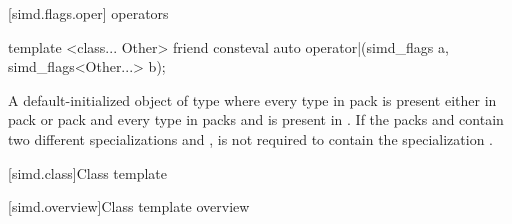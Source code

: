 [simd.flags.oper]{ operators}

\begin{itemdecl}
template <class... Other>
  friend consteval auto operator|(simd_flags a, simd_flags<Other...> b);
\end{itemdecl}

\begin{itemdescr}
  \pnum\returns
  A default-initialized object of type  where
  every type in pack  is present either in pack  or
  pack  and every type in packs  and  is
  present in .
  If the packs  and  contain two
  different specializations  and
  ,  is not required to contain the
  specialization .
\end{itemdescr}

[simd.class]{Class template }

[simd.overview]{Class template  overview}

